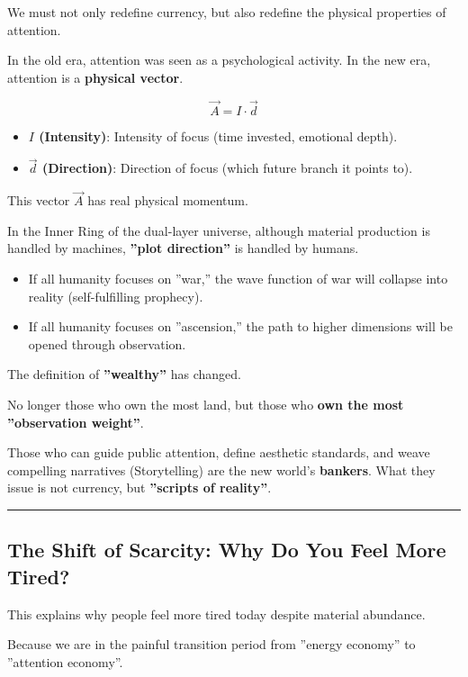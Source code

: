 We must not only redefine currency, but also redefine the physical properties of attention.

In the old era, attention was seen as a psychological activity. In the new era, attention is a \textbf{physical vector}.

$$\vec{A} = I \cdot \vec{d}$$

\begin{itemize}
\item \textbf{$I$ (Intensity)}: Intensity of focus (time invested, emotional depth).

\item \textbf{$\vec{d}$ (Direction)}: Direction of focus (which future branch it points to).
\end{itemize}

This vector $\vec{A}$ has real physical momentum.

In the Inner Ring of the dual-layer universe, although material production is handled by machines, \textbf{''plot direction''} is handled by humans.

\begin{itemize}
\item If all humanity focuses on ''war,'' the wave function of war will collapse into reality (self-fulfilling prophecy).

\item If all humanity focuses on ''ascension,'' the path to higher dimensions will be opened through observation.
\end{itemize}

The definition of \textbf{''wealthy''} has changed.

No longer those who own the most land, but those who \textbf{own the most ''observation weight''}.

Those who can guide public attention, define aesthetic standards, and weave compelling narratives (Storytelling) are the new world's \textbf{bankers}. What they issue is not currency, but \textbf{''scripts of reality''}.

\hrule

\subsection{The Shift of Scarcity: Why Do You Feel More Tired?}

This explains why people feel more tired today despite material abundance.

Because we are in the painful transition period from ''energy economy'' to ''attention economy''.

